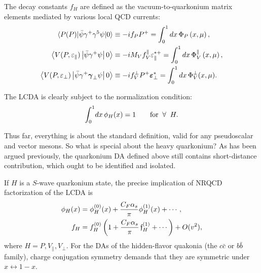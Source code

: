 \documentclass[english,preprint,aps,prd,showpacs,superscriptaddress,nofootinbib,tightenlines]{revtex4}
\def\bfgamma{\mbox{\boldmath $\gamma$}}
\def\bfvarepsilon{\mbox{\boldmath $\varepsilon$}}
\begin{document}
The decay constants $f_{H}$ are defined as the vacuum-to-quarkonium
matrix elements mediated by various local QCD currents:
\begin{subequations}
\begin{align}
\langle P (P) |\bar{\psi}\gamma^{+}\gamma^{5}\psi|0\rangle & \equiv  -i  f_{P} P^{+}= \int_{0}^{1}dx\,\Phi_{P}\left(x,\mu\right),\\
\left\langle V(P,\varepsilon_{\parallel})\left|\bar{\psi} \gamma^{+}\psi \right|0\right\rangle & \equiv -i M_V
f_V^{\parallel} \varepsilon_{\parallel}^{*+} = \int_{0}^{1}dx\,\Phi_{V}^{\parallel} \left(x,\mu\right),\\
\left\langle V(P,\varepsilon_{\perp})\left| \bar{\psi} \gamma^+ \bfgamma_\perp \psi \right|0\right\rangle & \equiv
-i f_{V}^\perp P^{+} \bfvarepsilon_{\perp}^{*}= \int_{0}^{1}dx\,\Phi_V^\perp(x,\mu).
\end{align}
\label{Def:decay:constant:LC}
\end{subequations}

The LCDA is clearly subject to the normalization condition:
\begin{align}
\int^1_0 \! dx\,\phi_H(x)=1 \qquad{\rm for} \;\;\forall\;\; H.
\end{align}

Thus far, everything is about the standard definition, valid for any pseudoscalar and vector mesons.
So what is special about the heavy quarkonium? As has been argued previously, the quarkonium DA defined above
still contains short-distance contribution, which ought to be identified and isolated.

If $H$ is a $S$-wave quarkonium state, the precise implication of NRQCD factorization of the LCDA is
\begin{subequations}
\begin{align}
\phi_H(x) &= \phi^{(0)}_H(x) + {C_F\alpha_s  \over \pi}\phi^{(1)}_H(x) +\cdots, \label{LCDA:pert:expansion} \\
f_{H} &= f_{H}^{(0)} \left(1+{C_F\alpha_s \over \pi}\,{\mathfrak f}_{H}^{(1)}+\cdots \right)+O(v^2), \label{Decay:constant:matching}
\end{align}
\label{Precise:meaning:NRQCD;fac:LCDA}
\end{subequations}
where $H= P, V_\parallel, V_\perp$. For the DAs of the hidden-flavor quakonia (the $c\bar{c}$ or $b\bar{b}$ family),
charge conjugation symmetry demands that they are symmetric under $x\leftrightarrow 1-x$.
\end{document}

